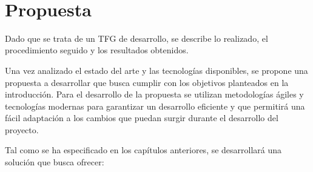 \newpage
~
\newpage
\chapter{Propuesta}
Dado que se trata de un TFG de desarrollo, se describe lo realizado, el procedimiento seguido y los resultados obtenidos.

Una vez analizado el estado del arte y las tecnologías disponibles, se propone una propuesta a desarrollar que busca cumplir con los objetivos planteados en la introducción. Para el desarrollo de la propuesta se utilizan metodologías ágiles y tecnologías modernas para garantizar un desarrollo eficiente y que permitirá una fácil adaptación a los cambios que puedan surgir durante el desarrollo del proyecto.

Tal como se ha especificado en los capítulos anteriores, se desarrollará una solución que busca ofrecer:
